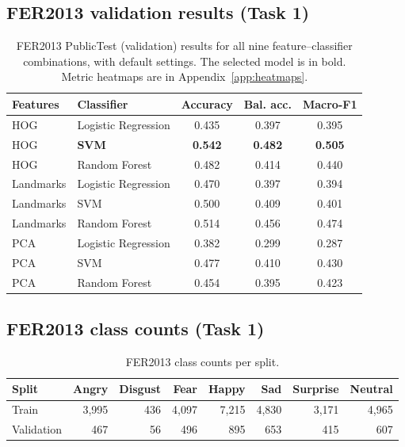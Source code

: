 \subsection{FER2013 validation results (Task 1)}
\label{app:fer-val}
\begin{table}[H]
\centering\small
\caption{FER2013 PublicTest (validation) results for all nine feature--classifier combinations, with default settings. The selected model is in bold. Metric heatmaps are in Appendix~\ref{app:heatmaps}.}
\label{tab:fer-val}
\begin{tabular}{@{}llccc@{}}\toprule
Features & Classifier & Accuracy & Bal. acc. & Macro-F1 \\\midrule
HOG & Logistic Regression & 0.435 & 0.397 & 0.395 \\
HOG & \textbf{SVM} & \textbf{0.542} & \textbf{0.482} & \textbf{0.505} \\
HOG & Random Forest & 0.482 & 0.414 & 0.440 \\
Landmarks & Logistic Regression & 0.470 & 0.397 & 0.394 \\
Landmarks & SVM & 0.500 & 0.409 & 0.401 \\
Landmarks & Random Forest & 0.514 & 0.456 & 0.474 \\
PCA & Logistic Regression & 0.382 & 0.299 & 0.287 \\
PCA & SVM & 0.477 & 0.410 & 0.430 \\
PCA & Random Forest & 0.454 & 0.395 & 0.423 \\
\bottomrule\end{tabular}
\end{table}

\FloatBarrier
\subsection{FER2013 class counts (Task 1)}
\label{app:fer-counts}
\begin{table}[H]
\centering\small
\caption{FER2013 class counts per split.}
\label{tab:fer-counts}
\begin{tabular}{@{}lrrrrrrr@{}}\toprule
Split & Angry & Disgust & Fear & Happy & Sad & Surprise & Neutral \\\midrule
Train & 3,995 & 436 & 4,097 & 7,215 & 4,830 & 3,171 & 4,965 \\
Validation & 467 & 56 & 496 & 895 & 653 & 415 & 607 \\
\bottomrule\end{tabular}
\end{table}

